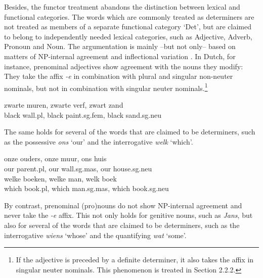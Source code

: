 \documentclass[output=paper]{langsci/langscibook}
\begin{document}
Besides, the functor treatment abandons the distinction between lexical and 
functional categories. The words which are commonly treated as determiners
are not treated as members of a separate functional category `Det', but are 
claimed to belong to independently needed lexical categories, such as Adjective, 
Adverb, Pronoun and Noun. The argumentation is mainly --but not only-- based on 
matters of NP-internal agreement and inflectional variation \citep{VanEynde06}. 
In Dutch, for instance, prenominal adjectives show agreement with 
the nouns they modify: They take the affix \emph{-e} in combination with plural 
and singular non-neuter nominals, but not in combination with singular 
neuter nominals.\footnote{If the adjective is preceded by a definite determiner, 
it also takes the affix in singular neuter nominals. This phenomenon is treated 
in Section 2.2.2.} 

\begin{exe} 
\ex\label{wit} 
\gll  zwarte muren,        zwarte verf,              zwart zand \\
      black wall.{\sc pl}, black paint.{\sc sg.fem}, black sand.{\sc sg.neu} \\
\end{exe} 

\noindent
The same holds for several of the words that are claimed to be determiners, 
such as the possessive \emph{ons} `our' and the interrogative \emph{welk} `which'. 

\begin{exe} 
\ex\label{ons}
\gll onze ouders,         onze muur,             ons huis     \\
     our parent.{\sc pl}, our wall.{\sc sg.mas}, our house.{\sc sg.neu} \\
\ex\label{welk} 
\gll welke boeken,        welke man,              welk boek   \\
     which book.{\sc pl}, which man.{\sc sg.mas}, which book.{\sc sg.neu} \\
\end{exe} 

\noindent
By contrast, prenominal (pro)nouns do not show NP-internal agreement and  
never take the \emph{-e} affix. This not only holds for genitive nouns, 
such as \emph{Jans}, but also for several of the words that are claimed 
to be determiners, such as the interrogative \emph{wiens} `whose' 
and the quantifying \emph{wat} `some'. 
\end{document}
